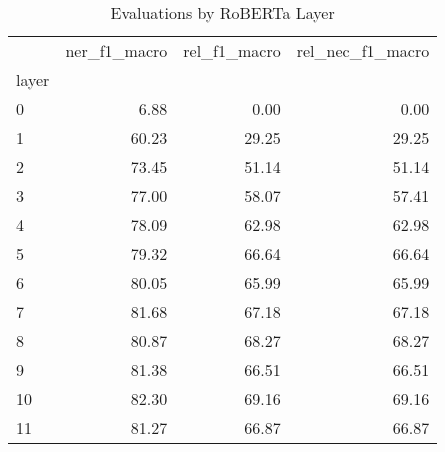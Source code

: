 \begin{table}
\centering
\caption{Evaluations by RoBERTa Layer}
\label{tab:rob-layers}
\begin{tabular}{lrrr}
\toprule
{} &  ner\_f1\_macro &  rel\_f1\_macro &  rel\_nec\_f1\_macro \\
layer &               &               &                   \\
\midrule
0     &          6.88 &          0.00 &              0.00 \\
1     &         60.23 &         29.25 &             29.25 \\
2     &         73.45 &         51.14 &             51.14 \\
3     &         77.00 &         58.07 &             57.41 \\
4     &         78.09 &         62.98 &             62.98 \\
5     &         79.32 &         66.64 &             66.64 \\
6     &         80.05 &         65.99 &             65.99 \\
7     &         81.68 &         67.18 &             67.18 \\
8     &         80.87 &         68.27 &             68.27 \\
9     &         81.38 &         66.51 &             66.51 \\
10    &         82.30 &         69.16 &             69.16 \\
11    &         81.27 &         66.87 &             66.87 \\
\bottomrule
\end{tabular}
\end{table}
